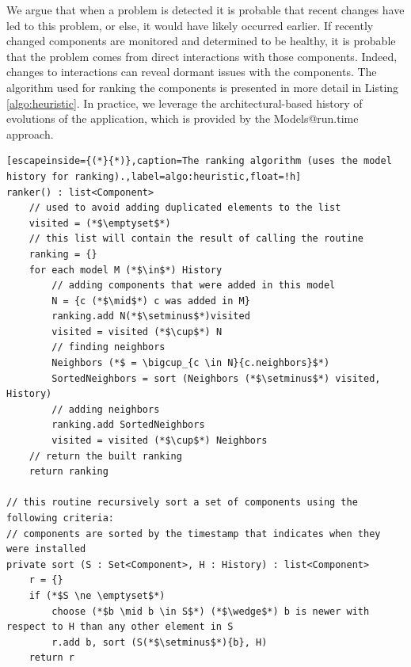 We argue that when a problem is detected it is probable that recent changes have led to this problem, or else, it would have likely occurred earlier.
If recently changed components are monitored and determined to be healthy, it is probable that the problem comes from direct interactions with those components.
Indeed, changes to interactions can reveal dormant issues with the components.
The algorithm used for ranking the components is presented in more detail in Listing \ref{algo:heuristic}.
In practice, we leverage the architectural-based history of evolutions of the application, which is provided by the Models@run.time approach.


\begin{lstlisting}[escapeinside={(*}{*)},caption=The ranking algorithm (uses the model history for ranking).,label=algo:heuristic,float=!h]
ranker() : list<Component>
	// used to avoid adding duplicated elements to the list
	visited = (*$\emptyset$*)
	// this list will contain the result of calling the routine
	ranking = {}
	for each model M (*$\in$*) History
		// adding components that were added in this model
		N = {c (*$\mid$*) c was added in M}
		ranking.add N(*$\setminus$*)visited
		visited = visited (*$\cup$*) N
		// finding neighbors
		Neighbors (*$ = \bigcup_{c \in N}{c.neighbors}$*)
		SortedNeighbors = sort (Neighbors (*$\setminus$*) visited, History)
		// adding neighbors
		ranking.add SortedNeighbors
		visited = visited (*$\cup$*) Neighbors
	// return the built ranking
	return ranking

// this routine recursively sort a set of components using the following criteria:
// components are sorted by the timestamp that indicates when they were installed
private sort (S : Set<Component>, H : History) : list<Component>
	r = {}
	if (*$S \ne \emptyset$*)
		choose (*$b \mid b \in S$*) (*$\wedge$*) b is newer with respect to H than any other element in S
		r.add b, sort (S(*$\setminus$*){b}, H)
	return r
\end{lstlisting}

